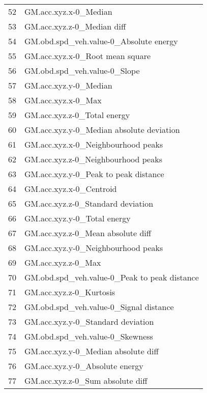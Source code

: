 \begin{tabular}{ll}
52  &                             GM.acc.xyz.x-0\_Median \\
53  &                        GM.acc.xyz.z-0\_Median diff \\
54  &            GM.obd.spd\_veh.value-0\_Absolute energy \\
55  &                   GM.acc.xyz.x-0\_Root mean square \\
56  &                      GM.obd.spd\_veh.value-0\_Slope \\
57  &                             GM.acc.xyz.y-0\_Median \\
58  &                                GM.acc.xyz.x-0\_Max \\
59  &                       GM.acc.xyz.z-0\_Total energy \\
60  &          GM.acc.xyz.y-0\_Median absolute deviation \\
61  &                GM.acc.xyz.x-0\_Neighbourhood peaks \\
62  &                GM.acc.xyz.z-0\_Neighbourhood peaks \\
63  &              GM.acc.xyz.y-0\_Peak to peak distance \\
64  &                           GM.acc.xyz.x-0\_Centroid \\
65  &                 GM.acc.xyz.z-0\_Standard deviation \\
66  &                       GM.acc.xyz.y-0\_Total energy \\
67  &                 GM.acc.xyz.z-0\_Mean absolute diff \\
68  &                GM.acc.xyz.y-0\_Neighbourhood peaks \\
69  &                                GM.acc.xyz.z-0\_Max \\
70  &      GM.obd.spd\_veh.value-0\_Peak to peak distance \\
71  &                           GM.acc.xyz.z-0\_Kurtosis \\
72  &            GM.obd.spd\_veh.value-0\_Signal distance \\
73  &                 GM.acc.xyz.y-0\_Standard deviation \\
74  &                   GM.obd.spd\_veh.value-0\_Skewness \\
75  &               GM.acc.xyz.y-0\_Median absolute diff \\
76  &                    GM.acc.xyz.y-0\_Absolute energy \\
77  &                  GM.acc.xyz.z-0\_Sum absolute diff \\

\end{tabular}
